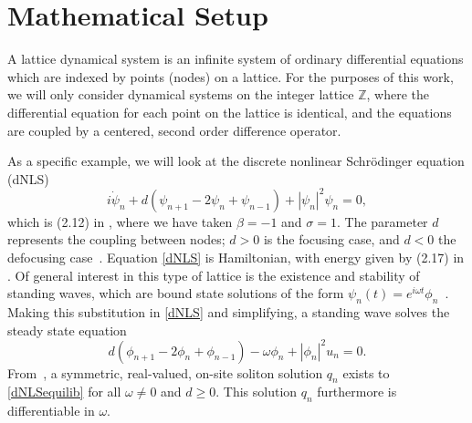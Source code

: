 \documentclass[12pt]{article}
\def\Z{{\mathbb Z}}
\begin{document}
\section{Mathematical Setup}

A lattice dynamical system is an infinite system of ordinary differential equations which are indexed by points (nodes)
on a lattice. For the purposes of this work, we will only consider dynamical systems on the integer lattice $\Z$, where the differential equation for each point on the lattice is identical, and the equations are coupled by a centered, second order difference operator.

As a specific example, we will look at the discrete nonlinear Schr{\"o}dinger equation (dNLS)
\begin{equation}\label{dNLS}
i\dot{\psi}_n + d(\psi_{n+1} - 2 \psi_n + \psi_{n-1}) + |\psi_n|^2 \psi_n = 0,
\end{equation}
which is (2.12) in \cite{Kevrekidis2009}, where we have taken $\beta = -1$ and $\sigma = 1$. The parameter $d$ represents the coupling between nodes; $d > 0$ is the focusing case, and $d < 0$ the defocusing case~\cite{Kevrekidis2009}. Equation \eqref{dNLS} is Hamiltonian, with energy given by (2.17) in \cite{Kevrekidis2009,pelinovsky_2011}. Of general interest in this type of lattice is the existence and stability of standing waves, which are bound state solutions of the form $\psi_n(t) = e^{i \omega t}\phi_n$~\cite{alfimov}. Making this substitution in \eqref{dNLS} and simplifying, a standing wave solves the steady state equation
\begin{equation}\label{dNLSequilib}
d(\phi_{n+1} - 2 \phi_n + \phi_{n-1}) - \omega \phi_n + |\phi_n|^2 u_n = 0.
\end{equation}
From~\cite{herrmann_2011}, a symmetric, real-valued, on-site soliton solution $q_n$ exists to \eqref{dNLSequilib} for all $\omega \neq 0$ and $d \geq 0$. This solution $q_n$ furthermore is differentiable in $\omega$. 
\end{document}
